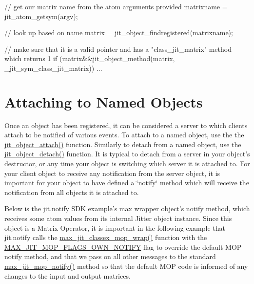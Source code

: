 \begin{DoxyCode}
// get our matrix name from the atom arguments provided
matrixname = jit_atom_getsym(argv);

// look up based on name
matrix = jit_object_findregistered(matrixname);

// make sure that it is a valid pointer and has a "class_jit_matrix" method which
       returns 1
if (matrix&&jit_object_method(matrix, _jit_sym_class_jit_matrix)) {
   ...
}    
\end{DoxyCode}
\hypertarget{chapter_jit_notification_chapter_jit_notification_attach}{}\section{Attaching to Named Objects}\label{chapter_jit_notification_chapter_jit_notification_attach}
Once an object has been registered, it can be considered a server to which clients attach to be notified of various events. To attach to a named object, use the the \hyperlink{group__objectmod_ga213166e8beeb29aca36c57cd07c722f1}{jit\_\-object\_\-attach()} function. Similarly to detach from a named object, use the \hyperlink{group__objectmod_gaa286218b643371fe28cbe261facd5b21}{jit\_\-object\_\-detach()} function. It is typical to detach from a server in your object's destructor, or any time your object is switching which server it is attached to. For your client object to receive any notification from the server object, it is important for your object to have defined a \char`\"{}notify\char`\"{} method which will receive the notification from all objects it is attached to.

Below is the jit.notify SDK example's max wrapper object's notify method, which receives some atom values from its internal Jitter object instance. Since this object is a Matrix Operator, it is important in the following example that jit.notify calls the \hyperlink{group__maxmopmod_ga7e08584771f58ce1fe0b190d27b5759b}{max\_\-jit\_\-classex\_\-mop\_\-wrap()} function with the \hyperlink{group__jitter_ga669c2f28bba1dfb4181ebae8f19488bc}{MAX\_\-JIT\_\-MOP\_\-FLAGS\_\-OWN\_\-NOTIFY} flag to override the default MOP notify method, and that we pass on all other messages to the standard \hyperlink{group__maxmopmod_ga5032d682c77bcb7e2dcdf0e77d863d3c}{max\_\-jit\_\-mop\_\-notify()} method so that the default MOP code is informed of any changes to the input and output matrices.


